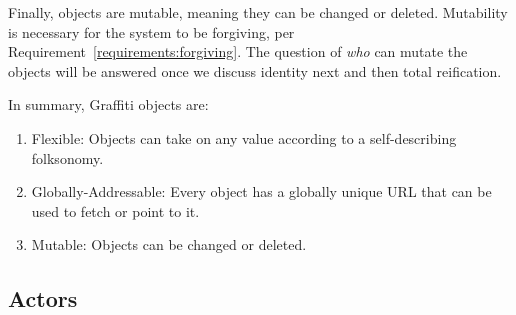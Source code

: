Finally, objects are mutable, meaning they can be changed or deleted.
Mutability is necessary for the system to be forgiving, per Requirement~\ref{requirements:forgiving}.
The question of \emph{who} can mutate the objects
will be answered once we discuss identity next and then total reification.

In summary, Graffiti objects are:

\begin{enumerate}
\item
Flexible: Objects can take on any value according to a self-describing folksonomy.
\item
Globally-Addressable: Every object has a globally unique URL that can be used to fetch or point to it.
\item
Mutable: Objects can be changed or deleted.
\end{enumerate}


\subsection{Actors}
\label{concepts:actors}

